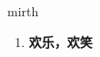 
\begin{frame}
{\huge mirth}
\begin{center}
\begin{enumerate}\Large
  \item \textbf{欢乐，欢笑}
\end{enumerate}
\end{center}
\end{frame}
